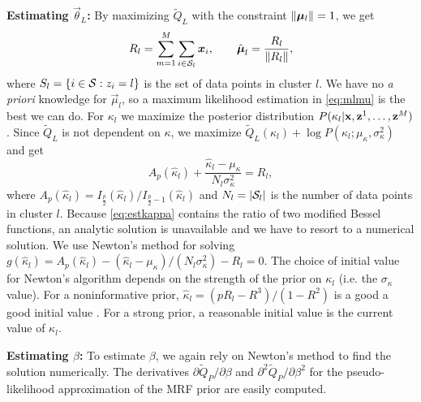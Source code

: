 \documentclass[runningheads, a4paper]{llncs}
\begin{document}
\textbf {Estimating $\vec \theta_L$:} By maximizing $\widetilde Q_L$
with the constraint $\norm{\vec \mu_l} = 1$, we get
\begin{equation}
  R_l = \sum_{m=1}^{M}\sum_{i \in \cS_l}^{} \vec x_i, \qquad \hat {\vec \mu}_l = \frac{R_l}{\norm{R_l}},
  \label{eq:mlmu}
\end{equation}
where $S_l = \{ i \in \mathcal{S}: z_i = l\}$ is the set of data points in cluster
$l$. We have no \emph{a priori} knowledge for $\vec \mu_l$, so a maximum
likelihood estimation in \eqref{eq:mlmu} is the best we can do. For $\kappa_l$
we
maximize the posterior distribution $P(\kappa_l | \text{\bf x}, \text{\bf z}^1, \dots, \text{\bf z}^M) $.  Since $\widetilde Q_L$ is not dependent on $\kappa$, we
maximize $\widetilde Q_L(\kappa_l) + \log P(\kappa_l; \mu_{\kappa},
\sigma_{\kappa}^2)$ and get
\begin{equation}
  A_p(\hat \kappa_l) + \frac{\hat \kappa_l - \mu_{\kappa}}{N_l\sigma_{\kappa}^2} = R_l,
  \label{eq:estkappa}
\end{equation}
where $A_p(\hat \kappa_l) = I_{\frac{p}{2}} (\hat \kappa_l) / I_{\frac{p}{2}-1}
(\hat \kappa_l)$ and $N_l = |\mathcal{S}_l|$ is the number of data points in cluster
$l$. Because \eqref{eq:estkappa} contains the ratio of two modified Bessel
functions, an analytic solution is unavailable and we have to resort to a
numerical solution. We use Newton's method for solving $g(\hat \kappa_l) =
A_p(\hat \kappa_l) -(\hat \kappa_l - \mu_{\kappa}) / (N_l\sigma_{\kappa}^2) -
R_l= 0$. The choice of initial value for Newton's algorithm depends on the
strength of the prior on $\kappa_l$ (i.e. the $\sigma_{\kappa}$ value). For a
noninformative prior, $\hat \kappa_l = (pR_l - R^3) / (1 - R^2)$ is a good a
good initial value \cite{banerjee2006clustering}. For a strong prior, a
reasonable initial value is the current value of $\kappa_l$.

\textbf{Estimating $\beta$:} To estimate $\beta$, we again rely on Newton's method
to find the solution numerically. The derivatives $\partial \widetilde Q_P
/ \partial \beta$ and $\partial^2 \widetilde Q_P / \partial \beta^2$ for the
pseudo-likelihood approximation of the MRF prior are easily computed.


\end{document}
